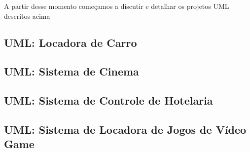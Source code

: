 \documentclass[a4paper,10pt]{article}
\begin{document}
A partir desse momento começamos a discutir e detalhar os projetos UML descritos acima

\subsection{UML: Locadora de Carro}

\subsection{UML: Sistema de Cinema}

\subsection{UML: Sistema de Controle de Hotelaria} 

\subsection{UML: Sistema de Locadora de Jogos de Vídeo Game}


 
\end{document}
